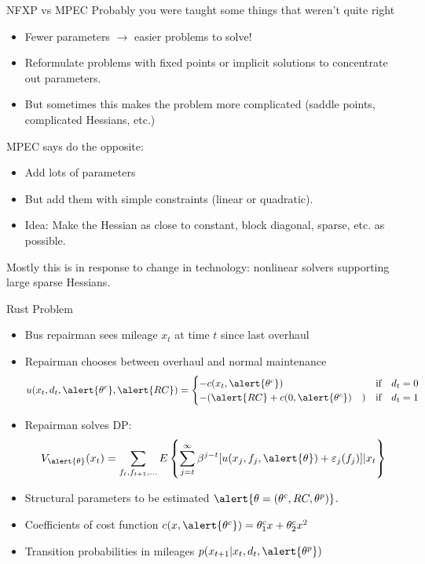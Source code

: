 \begin{frame}{NFXP vs MPEC}
Probably you were taught some things that weren't quite right
\begin{itemize}
\item Fewer parameters $\rightarrow$ easier problems to solve!
\item Reformulate problems with fixed points or implicit solutions to \alert{concentrate out} parameters.
\item But sometimes this makes the problem more complicated (saddle points, complicated Hessians, etc.)
\end{itemize}
MPEC says do the opposite:
\begin{itemize}
\item Add lots of parameters
\item But add them with simple constraints (linear or quadratic).
\item Idea: Make the Hessian as close to constant, block diagonal, sparse, etc. as possible.
\end{itemize}
Mostly this is in response to change in technology: nonlinear solvers supporting large sparse Hessians.
\end{frame}



\begin{frame}{Rust Problem}
\footnotesize
\begin{itemize}
\item Bus repairman sees mileage $x_t$ at time $t$ since last overhaul
\item Repairman chooses between overhaul and normal maintenance
\begin{align*}
u(x_t, d_t, \alert{\theta^c}, \alert{RC}) =
\begin{cases} -c(x_t,\alert{\theta^c}) \quad &\mbox{if} \quad d_t=0\\
-(\alert{RC} + c(0,\alert{\theta^c}) \quad) &\mbox{if} \quad d_t =1\\
\end{cases}
\end{align*}
\item Repairman solves DP:
\begin{align*}
V_{\alert{\theta}} (x_t) = \sum_{f_t,f_{t+1},\ldots} E \left\{  \sum_{j=t}^{\infty} \beta^{j-t}   [u(x_j,f_j,\alert{\theta}) + \varepsilon_{j}(f_j)]| x_t \right\}
\end{align*}
\end{itemize}
\begin{itemize}
\item Structural parameters to be estimated $\alert{\theta = (\theta^c, RC, \theta^p)}$.
\item Coefficients of cost function $c(x,\alert{\theta^c}) = \theta^c_1 x + \theta^c_2 x^2$
\item Transition probabilities in mileages $p(x_{t+1} | x_t, d_t, \alert{\theta^p})$
\end{itemize}
\end{frame}


